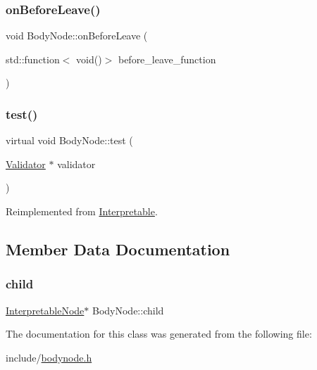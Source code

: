 \subsubsection{\texorpdfstring{on\+Before\+Leave()}{onBeforeLeave()}}
{\footnotesize\ttfamily void Body\+Node\+::on\+Before\+Leave (\begin{DoxyParamCaption}\item[{std\+::function$<$ void()$>$}]{before\+\_\+leave\+\_\+function }\end{DoxyParamCaption})}

\mbox{\label{classBodyNode_a80e75b0ab6c388c34a82bdce63fdc7bb}} 
\subsubsection{\texorpdfstring{test()}{test()}}
{\footnotesize\ttfamily virtual void Body\+Node\+::test (\begin{DoxyParamCaption}\item[{\hyperlink{classValidator}{Validator} $\ast$}]{validator }\end{DoxyParamCaption})\hspace{0.3cm}{\ttfamily [virtual]}}



Reimplemented from \hyperlink{classInterpretable_a32f547aaf68dcbab993284d3257ab010}{Interpretable}.



\subsection{Member Data Documentation}
\mbox{\label{classBodyNode_a6b18b29807903661a9f06e865331fca4}} 
\subsubsection{\texorpdfstring{child}{child}}
{\footnotesize\ttfamily \hyperlink{classInterpretableNode}{Interpretable\+Node}$\ast$ Body\+Node\+::child}



The documentation for this class was generated from the following file\+:\begin{DoxyCompactItemize}
\item 
include/\hyperlink{bodynode_8h}{bodynode.\+h}\end{DoxyCompactItemize}
